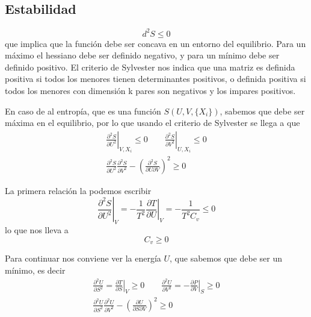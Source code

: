 \documentclass{book}
\numberwithin{equation}{section} %
\begin{document}
\subsection{Estabilidad}
\[d^2 S \leq 0\]
que implica que la función debe ser concava en un entorno del equilibrio.
Para un máximo el hessiano debe ser definido negativo, y para un mínimo debe ser definido positivo.
El criterio de Sylvester nos indica que una matriz es definida positiva si todos los menores tienen determinantes positivos, o definida positiva si todos los menores con dimensión k pares son negativos y los impares positivos.

En caso de al entropía, que es una función $S(U,V,\{X_i\})$, sabemos que debe ser máxima en el equilibrio, por lo que usando el criterio de Sylvester se llega a que
\begin{equation}
\begin{gathered}
    \left.\frac{\partial^2 S}{\partial U^2}\right|_{V,X_i} \leq 0 \qquad
    \left.\frac{\partial^2 S}{\partial V^2}\right|_{U,X_i} \leq 0\\
    \frac{\partial^2 S}{\partial U^2} \frac{\partial^2 S}{\partial V^2} - \left(\frac{\partial^2 S}{\partial U \partial V}\right)^2 \geq 0
\end{gathered}
\end{equation}

La primera relación la podemos escribir
\[\left.\frac{\partial^2 S}{\partial U^2}\right|_V = - \frac{1}{T^2} \left.\frac{\partial T}{\partial U}\right|_V = - \frac{1}{T^2 C_v} \leq 0\]
lo que nos lleva a
\begin{equation}
    C_v \geq 0
\end{equation}

Para continuar nos conviene ver la energía $U$, que sabemos que debe ser un mínimo, es decir
\begin{equation}
\begin{gathered}
    \frac{\partial^2 U}{\partial S^2} = \left.\frac{\partial T}{\partial S}\right|_V \geq 0 \qquad
    \frac{\partial^2 U}{\partial V^2} = - \left.\frac{\partial P}{\partial V}\right|_S \geq 0\\
    \frac{\partial^2 U}{\partial S^2} \frac{\partial^2 U}{\partial V^2} - \left(\frac{\partial U}{\partial S \partial V}\right)^2 \geq 0
\end{gathered}
\end{equation}
\end{document}
